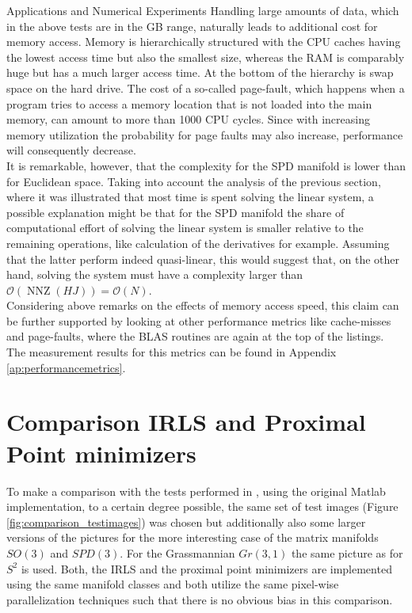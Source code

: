\begin{chapter}{Applications and Numerical Experiments}
Handling large amounts of data, which in the above tests are in the GB range, naturally leads to additional cost for memory access. Memory is hierarchically structured with the CPU caches having the lowest access time but also the smallest size, whereas the RAM is comparably huge but has a much larger access time. At the bottom
of the hierarchy is swap space on the hard drive. The cost of a so-called page-fault, which happens when a program tries to access
a memory location that is not loaded into the main memory, can amount to more than 1000 CPU cycles. Since with increasing memory
utilization the probability for page faults may also increase, performance will consequently decrease.\\

It is remarkable, however, that the complexity for the SPD manifold is lower than for Euclidean space. 
Taking into account the analysis of the previous section, where it was illustrated that most time is spent solving the linear system, a 
possible explanation might be that for the SPD manifold the share of computational effort of solving the linear system is smaller
relative to the remaining operations, like calculation of the derivatives for example. Assuming that the latter perform indeed
quasi-linear, this would suggest that, on the other hand, solving the system must have a complexity larger than 
$\mathcal{O}(\operatorname{NNZ}(HJ))=\mathcal{O}(N)$.\\

Considering above remarks on the effects of memory access speed, this claim can be further supported by looking at other performance metrics like
cache-misses and page-faults, where the BLAS routines are again at the top of the listings.
The measurement results for this metrics can be found in Appendix \ref{ap:performancemetrics}.


\FloatBarrier
\section{Comparison IRLS and Proximal Point minimizers} %
\label{sec:Comparison IRLS and proximal point minimizers}

To make a comparison with the tests performed in \cite{SprecherIRLS}, using the original Matlab implementation, to a certain degree possible,  the same set of test images (Figure \ref{fig:comparison_testimages}) was chosen but additionally also some larger versions of the pictures for the more interesting 
case of the matrix manifolds $SO(3)$ and $SPD(3)$. For the Grassmannian $Gr(3,1)$ the same picture as
for $S^2$ is used.
Both, the IRLS and the proximal point minimizers are implemented using the same manifold classes and both utilize the
same pixel-wise parallelization techniques such that there is no obvious bias in this comparison.\\


\end{chapter}
